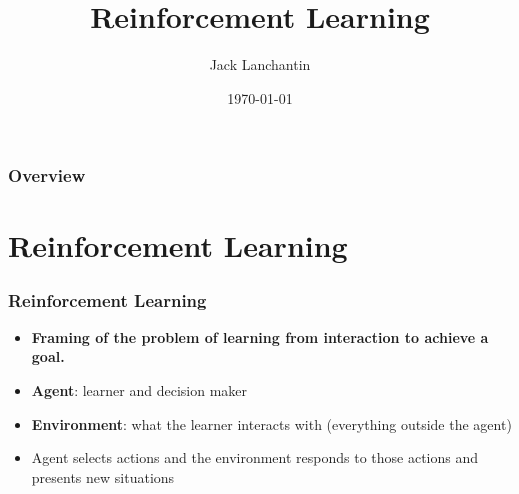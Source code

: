 \documentclass{beamer}
\title[Reinforcement Learning]{Reinforcement Learning} %
\author{Jack Lanchantin} %
\date{\today} %
\begin{document}
\begin{frame}
\titlepage %
\end{frame}

\begin{frame}
\frametitle{Overview} %
\tableofcontents %
\end{frame}

\section{Reinforcement Learning} %

\begin{frame}
\frametitle{Reinforcement Learning}
\begin{itemize}
\item \textbf{Framing of the problem of learning from interaction to achieve a goal.}
\item \textbf{Agent}: learner and decision maker
\item \textbf{Environment}: what the learner interacts with (everything outside the agent)
\item Agent selects actions and the environment responds to those actions and presents new situations
\end{itemize}
\end{frame}

\end{document}
